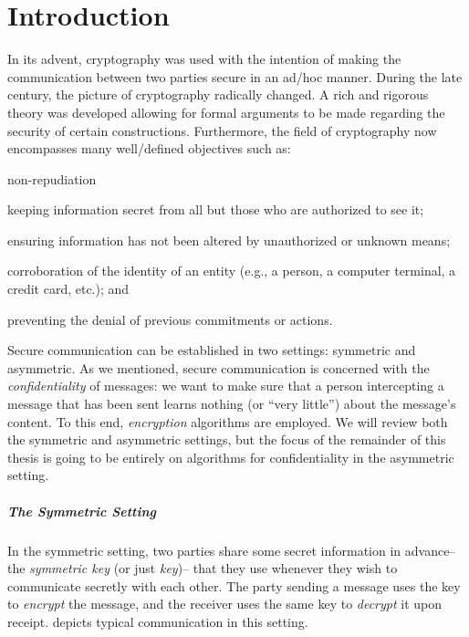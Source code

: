 \documentclass[version=last, paper=A4, parskip=half, oneside,%
toc=bibliography, toc=listof, listof=leveldown]{scrbook}
\theoremstyle{plain}
\theoremstyle{definition}
\theoremstyle{remark}
\begin{document}
\mainmatter{}

\chapter{Introduction}\label{chap:introduction}

In its advent, cryptography was used with the intention of making the
communication between two parties secure in an ad\-/hoc manner.  During the late
 century, the picture of cryptography radically changed.  A rich and
rigorous theory was developed allowing for formal arguments to be made regarding
the security of certain constructions.  Furthermore, the field of cryptography
now encompasses many well\-/defined objectives such as:
\begingroup
{}
\begin{labeling}[~--]{non-repudiation}
\item[confidentiality] keeping information secret from all but those
  who are authorized to see it;
\item[data integrity] ensuring information has not been altered by unauthorized
  or unknown means;
\item[authentication] corroboration of the identity of an entity (e.g., a
  person, a computer terminal, a credit card, etc.); and
\item[non\-/repudiation] preventing the denial of previous commitments or
  actions.
\end{labeling}
\endgroup

Secure communication can be established in two settings: symmetric and
asymmetric.  As we mentioned, secure communication is concerned with the
\emph{confidentiality} of messages: we want to make sure that a person
intercepting a message that has been sent learns nothing (or \enquote{very
  little}) about the message's content.  To this end, \emph{encryption}
algorithms are employed.  We will review both the symmetric and asymmetric
settings, but the focus of the remainder of this thesis is going to be entirely
on algorithms for confidentiality in the asymmetric setting.

\paragraph{The Symmetric Setting} In the symmetric setting, two parties share
some secret information in advance\--- the \emph{symmetric key} (or just
\emph{key})\--- that they use whenever they wish to communicate secretly with
each other.  The party sending a message uses the key to \emph{encrypt} the
message, and the receiver uses the same key to \emph{decrypt} it upon receipt.
 depicts typical communication in this setting.
\end{document}
